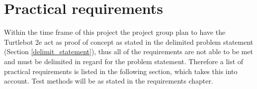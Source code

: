 \newpage

\chapter{Practical requirements}\label{prac_req}

Within the time frame of this project the project group plan to have the Turtlebot 2e act as proof of concept as stated in the delimited problem statement (Section \ref{delimit_statement}), thus all of the requirements are not able to be met and must be delimited in regard for the problem statement. Therefore a list of practical requirements is listed in the following section, which takes this into account. Test methods will be as stated in the requirements chapter.

\vspace{-3mm}

\vspace{-1mm}

